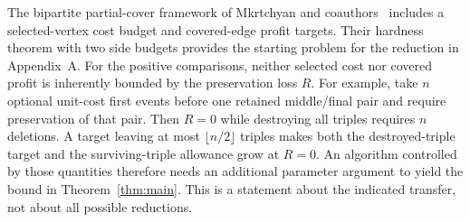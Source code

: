 The bipartite partial-cover framework of
Mkrtchyan and coauthors~\citep{mkrtchyan2024} includes a selected-vertex cost
budget and covered-edge profit targets. Their hardness theorem with two side budgets
provides the starting problem for the reduction in Appendix~A. For the positive comparisons,
neither selected cost nor covered profit is inherently bounded by the preservation loss $R$.
For example, take $n$ optional unit-cost first events before one retained
middle/final pair and require preservation of that pair. Then $R=0$ while
destroying all triples requires $n$ deletions. A target leaving at most
$\lfloor n/2\rfloor$ triples makes both the destroyed-triple target and the
surviving-triple allowance grow at $R=0$. An algorithm controlled by those
quantities therefore needs an additional parameter argument to yield the bound in Theorem~\ref{thm:main}. This is a statement about the indicated transfer, not about all
possible reductions.
